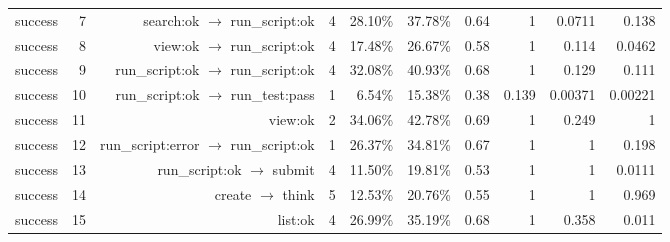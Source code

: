\begin{tabular}{lrrrrrrrrr}
success & 7 & search:ok $\to$ run\_script:ok & 4 & 28.10\% & 37.78\% & 0.64 & 1 & 0.0711 & 0.138 \\
success & 8 & view:ok $\to$ run\_script:ok & 4 & 17.48\% & 26.67\% & 0.58 & 1 & 0.114 & 0.0462 \\
success & 9 & run\_script:ok $\to$ run\_script:ok & 4 & 32.08\% & 40.93\% & 0.68 & 1 & 0.129 & 0.111 \\
success & 10 & run\_script:ok $\to$ run\_test:pass & 1 & 6.54\% & 15.38\% & 0.38 & 0.139 & 0.00371 & 0.00221 \\
success & 11 & view:ok & 2 & 34.06\% & 42.78\% & 0.69 & 1 & 0.249 & 1 \\
success & 12 & run\_script:error $\to$ run\_script:ok & 1 & 26.37\% & 34.81\% & 0.67 & 1 & 1 & 0.198 \\
success & 13 & run\_script:ok $\to$ submit & 4 & 11.50\% & 19.81\% & 0.53 & 1 & 1 & 0.0111 \\
success & 14 & create $\to$ think & 5 & 12.53\% & 20.76\% & 0.55 & 1 & 1 & 0.969 \\
success & 15 & list:ok & 4 & 26.99\% & 35.19\% & 0.68 & 1 & 0.358 & 0.011 \\
\bottomrule
\end{tabular}
